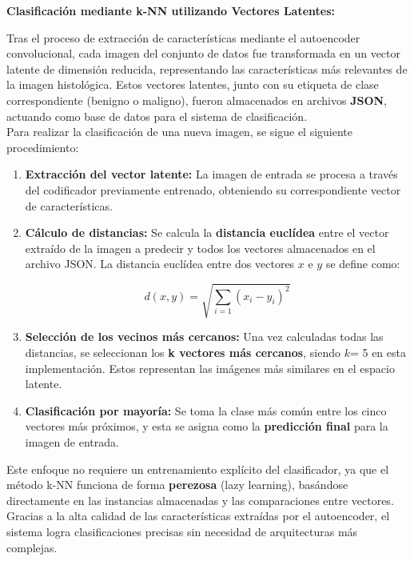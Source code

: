 \documentclass[12pt]{article} %
\begin{document}
\textbf{Clasificación mediante k-NN utilizando Vectores Latentes:}

Tras el proceso de extracción de características mediante el autoencoder convolucional, cada imagen del conjunto de datos fue transformada en un vector latente de dimensión reducida, representando las características más relevantes de la imagen histológica. Estos vectores latentes, junto con su etiqueta de clase correspondiente (benigno o maligno), fueron almacenados en archivos \textbf{JSON}, actuando como base de datos para el sistema de clasificación.\\

Para realizar la clasificación de una nueva imagen, se sigue el siguiente procedimiento:

\begin{enumerate}
    \item \textbf{Extracción del vector latente:} La imagen de entrada se procesa a través del codificador previamente entrenado, obteniendo su correspondiente vector de características.
    
    \item \textbf{Cálculo de distancias:} Se calcula la \textbf{distancia euclídea} entre el vector extraído de la imagen a predecir y todos los vectores almacenados en el archivo JSON. La distancia euclídea entre dos vectores \( x \) e \( y \) se define como:
    
    \begin{equation}
        d(x, y) = \sqrt{ \sum_{i=1} (x_i - y_i)^2 }
    \end{equation}

    \item \textbf{Selección de los vecinos más cercanos:} Una vez calculadas todas las distancias, se seleccionan los \textbf{k vectores más cercanos}, siendo \(k \)= 5 en esta implementación. Estos representan las imágenes más similares en el espacio latente.
    \item \textbf{Clasificación por mayoría:} Se toma la clase más común entre los cinco vectores más próximos, y esta se asigna como la \textbf{predicción final} para la imagen de entrada.

\end{enumerate}

Este enfoque no requiere un entrenamiento explícito del clasificador, ya que el método k-NN funciona de forma \textbf{perezosa} (lazy learning), basándose directamente en las instancias almacenadas y las comparaciones entre vectores. Gracias a la alta calidad de las características extraídas por el autoencoder, el sistema logra clasificaciones precisas sin necesidad de arquitecturas más complejas.
\end{document}
